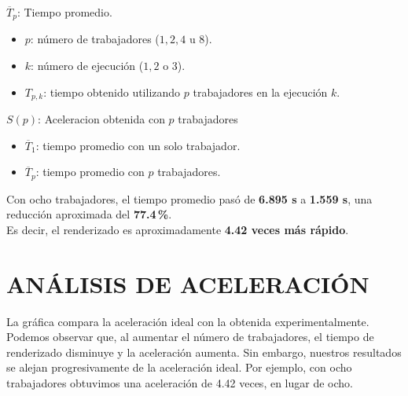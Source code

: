 \documentclass[conference,letterpaper,10pt]{IEEEtran}
\begin{document}
\(\overline{T}_p\): Tiempo promedio.
\begin{itemize}
  \item \(p\): número de trabajadores (\(1, 2, 4\) u \(8\)).
  \item \(k\): número de ejecución (\(1, 2\) o \(3\)).
  \item \(T_{p,k}\): tiempo obtenido utilizando \(p\) trabajadores en la ejecución \(k\).\\
\end{itemize}
\(S(p)  \): Aceleracion obtenida con \(p\) trabajadores
\begin{itemize}
  \item \(\overline{T}_1\): tiempo promedio con un solo trabajador.
  \item \(\overline{T}_p\): tiempo promedio con \(p\) trabajadores.\\
\end{itemize}

Con ocho trabajadores, el tiempo promedio pasó de
\textbf{6.895 s} a \textbf{1.559 s}, una reducción aproximada del \textbf{77.4\,\%}.\\
Es decir, el renderizado es aproximadamente \textbf{4.42 veces más rápido}.


\section{ANÁLISIS DE ACELERACIÓN}
\vspace{-0.4em}
\begin{figure}[H]
\centering
{}
\vspace{-0.5em}
\label{fig:speedup}
\end{figure}
\vspace{-1.0em}
La gráfica compara la aceleración ideal con la obtenida experimentalmente. 
Podemos observar que, al aumentar el número de trabajadores, el tiempo de renderizado disminuye y la aceleración aumenta.
Sin embargo, nuestros resultados se alejan progresivamente de la aceleración ideal. 
Por ejemplo, con ocho trabajadores obtuvimos una aceleración de 4.42 veces, en lugar de ocho.
\end{document}
